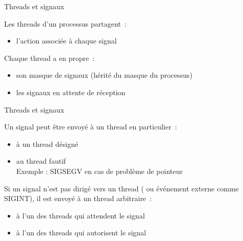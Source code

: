 

\begin {frame} {Threads et signaux}

    Les threads d'un processus partagent~:
    \begin {itemize}
	\item l'action associée à chaque signal \\
    \end {itemize}

    Chaque thread a en propre~:
    \begin {itemize}
	\item son masque de signaux (hérité du masque du processus)



	\item les signaux en attente de réception

    \end {itemize}
\end {frame}

\begin {frame} {Threads et signaux}

    Un signal peut être envoyé à un thread en particulier~:

    \begin {itemize}
	\item à un thread désigné \\
	\item au thread fautif \\
	    Exemple : SIGSEGV en cas de problème de pointeur
    \end {itemize}

    \vspace* {3mm}

    Si un signal n'est pas dirigé vers un thread (
    ou événement externe comme SIGINT), il est envoyé à un thread
    arbitraire~:

    \begin {itemize}
	\item à l'un des threads qui attendent le signal \\
	\item à l'un des threads qui autorisent le signal
    \end {itemize}

\end {frame}

